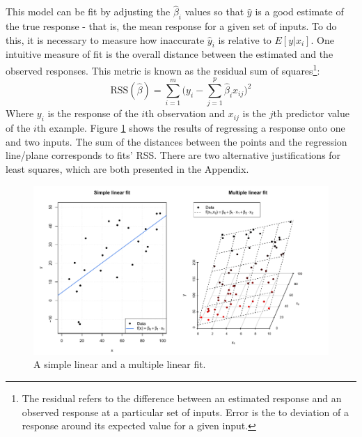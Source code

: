 \documentclass[11pt,a4paper,article]{memoir} %
\begin{document}
This model can be fit by adjusting the $\hat{\beta}_i$ values so that $\hat{y}$ is a good estimate of the true response - that is, the mean response for a given set of inputs. To do this, it is necessary to measure how inaccurate $\hat{y}_i$ is relative to $E[y|x_i]$. One intuitive measure of fit is the overall distance between the estimated and the observed responses. This metric is known as the residual sum of squares\footnote{The residual refers to the difference between an estimated response and an observed response at a particular set of inputs. Error is the to deviation of a response around its expected value for a given input.}:
\begin{equation}
	\text{RSS}(\hat{\beta}) = \sum_{i = 1}^m \Big(y_i - \sum_{j = 1}^p \hat{\beta}_i x_{ij}\Big)^2
	\label{eq:rss}
\end{equation}
Where $y_i$ is the response of the $i$th observation and $x_{ij}$ is the $j$th predictor value of the $i$th example. Figure \ref{fig:linear_regression} shows the results of regressing a response onto one and two inputs. The sum of the distances between the points and the regression line/plane corresponds to fits' RSS. There are two alternative justifications for least squares, which are both presented in the Appendix. 
\begin{figure}
\includegraphics[width=\textwidth]{linear_fits.pdf}
\caption{A simple linear and a multiple linear fit.}
\label{fig:linear_regression}
\end{figure}
\end{document}
